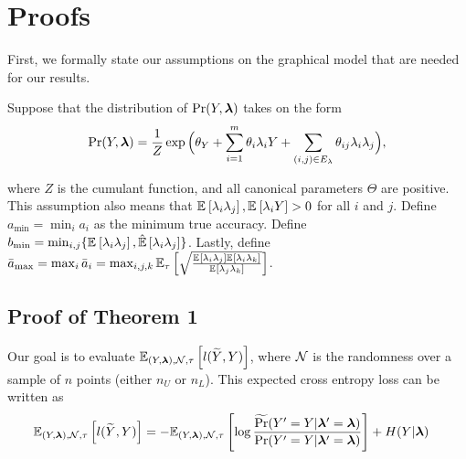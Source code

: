 

\section{Proofs}

First, we formally state our assumptions on the graphical model that are needed for our results.

\begin{assumption}
Suppose that the distribution of $\Pr(Y, \bm{\lambda})$ takes on the form
\begin{align}
    \Pr(Y, \bm{\lambda}) = \frac{1}{Z} \exp \Big(\theta_Y + \sum_{i = 1}^m \theta_i \lambda_i Y + \sum_{(i, j) \in E_{\lambda}} \theta_{ij} \lambda_i \lambda_j \Big),
    \label{eq:pgm}
\end{align}

where $Z$ is the cumulant function, and all canonical parameters $\Theta$ are positive. This assumption also means that $\mathbb{E}_{}\left[\lambda_i \lambda_j\right], \mathbb{E}_{}\left[\lambda_i Y\right] > 0$ for all $i$ and $j$. Define $a_{\min} = \min_i a_i$ as the minimum true accuracy. Define $b_{\min} = \min_{i,j} \{\mathbb{E}_{}\left[\lambda_i \lambda_j\right], \hat{\mathbb{E}}\left[\lambda_i \lambda_j\right] \}$. Lastly, define $\bar{a}_{\max} = \max_{i} \bar{a}_i = \max_{i,j,k} \mathbb{E}_{\tau}\left[\sqrt{\frac{\mathbb{E}_{}\left[\lambda_i \lambda_j\right] \mathbb{E}_{}\left[\lambda_i \lambda_k\right]}{\mathbb{E}_{}\left[\lambda_j \lambda_k\right]}}\right]$.
\label{assumptions}
\end{assumption}

\subsection{Proof of Theorem 1}

Our goal is to evaluate $\mathbb{E}_{(Y, \bm{\lambda}), \mathcal{N}, \tau}\left[l(\widetilde{Y}, Y)\right]$, where $\mathcal{N}$ is the randomness over a sample of $n$ points (either $n_U$ or $n_L$). This expected cross entropy loss can be written as
\begin{align}
    \mathbb{E}_{(Y, \bm{\lambda}), \mathcal{N}, \tau}\left[l(\widetilde{Y}, Y)\right] &= - \mathbb{E}_{(Y, \bm{\lambda}), \mathcal{N}, \tau}\left[ \log \frac{\widetilde{\Pr}(Y' = Y | \bm{\lambda}' = \bm{\lambda})}{\Pr(Y' = Y | \bm{\lambda}' = \bm{\lambda})}\right] + H(Y | \bm{\lambda}) \label{eq:cross-entropy}
\end{align}

